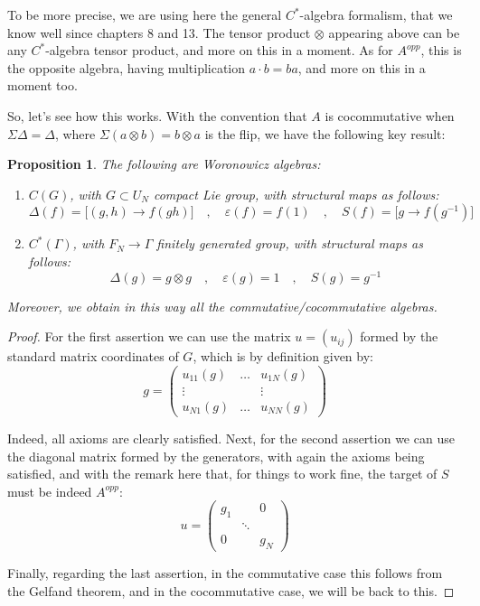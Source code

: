 \documentclass[12pt]{amsbook}
\newtheorem{proposition}[theorem]{Proposition}
\begin{document}
To be more precise, we are using here the general $C^*$-algebra formalism, that we know well since chapters 8 and 13. The tensor product $\otimes$ appearing above can be any $C^*$-algebra tensor product, and more on this in a moment. As for $A^{opp}$, this is the opposite algebra, having multiplication $a\cdot b=ba$, and more on this in a moment too.

\bigskip

So, let's see how this works. With the convention that $A$ is cocommutative when $\Sigma\Delta=\Delta$, where $\Sigma(a\otimes b)=b\otimes a$ is the flip, we have the following key result:

\begin{proposition}
The following are Woronowicz algebras:
\begin{enumerate}
\item $C(G)$, with $G\subset U_N$ compact Lie group, with structural maps as follows:
$$\Delta(f)=\big[(g,h)\to f(gh)\big]\quad,\quad 
\varepsilon(f)=f(1)\quad,\quad
S(f)=\big[g\to f(g^{-1})\big]$$

\item $C^*(\Gamma)$, with $F_N\to\Gamma$ finitely generated group, with structural maps as follows:
$$\Delta(g)=g\otimes g\quad,\quad 
\varepsilon(g)=1\quad,\quad
S(g)=g^{-1}$$
\end{enumerate}
Moreover, we obtain in this way all the commutative/cocommutative algebras.
\end{proposition}

\begin{proof}
For the first assertion we can use the matrix $u=(u_{ij})$ formed by the standard matrix coordinates of $G$, which is by definition given by:
$$g=\begin{pmatrix}
u_{11}(g)&\ldots&u_{1N}(g)\\
\vdots&&\vdots\\
u_{N1}(g)&\ldots&u_{NN}(g)
\end{pmatrix}$$

Indeed, all axioms are clearly satisfied. Next, for the second assertion we can use the diagonal matrix formed by the generators, with again the axioms being satisfied, and with the remark here that, for things to work fine, the target of $S$ must be indeed $A^{opp}$:
$$u=\begin{pmatrix}
g_1&&0\\
&\ddots&\\
0&&g_N
\end{pmatrix}$$

Finally, regarding the last assertion, in the commutative case this follows from the Gelfand theorem, and in the cocommutative case, we will be back to this.
\end{proof}
\end{document}
